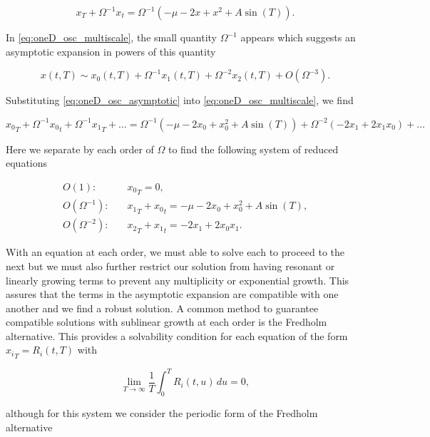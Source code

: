\begin{equation}\label{eq:oneD_osc_multiscale}
x_T+\Omega^{-1}x_t=\Omega^{-1}\left(-\mu-2x+x^2+A\sin(T)\right).
\end{equation}

In \eqref{eq:oneD_osc_multiscale}, the small quantity $\Omega^{-1}$ appears which suggests an asymptotic expansion in powers of this quantity

\begin{equation}\label{eq:oneD_osc_asymptotic}
x(t,T)\sim x_0(t,T)+\Omega^{-1}x_1(t,T)+\Omega^{-2}x_2(t,T)+O(\Omega^{-3}).
\end{equation}

Substituting \eqref{eq:oneD_osc_asymptotic} into \eqref{eq:oneD_osc_multiscale}, we find

\begin{equation*}
{x_0}_T+\Omega^{-1}{x_0}_t+\Omega^{-1}{x_1}_T+\ldots=\Omega^{-1}(-\mu-2x_0+x_0^2+A\sin(T))+\Omega^{-2}(-2x_1+2x_1x_0)+\ldots
\end{equation*}

Here we separate by each order of $\Omega$ to find the following system of reduced equations

\begin{align}
\label{eq:oneD_osc_outerO1}
O(1):& \quad {x_0}_T=0, \\
\label{eq:oneD_osc_outerO2}
O(\Omega^{-1}):& \quad {x_1}_T+{x_0}_t =-\mu-2x_0+x_0^2+A\sin(T),\\
\label{eq:oneD_osc_outerO3}
O(\Omega^{-2}):& \quad {x_2}_T + {x_1}_t= -2x_1+2x_0 x_1.
\end{align}

With an equation at each order, we must able to solve each to proceed to the next but we must also further restrict our solution from having resonant or linearly growing terms to prevent any multiplicity or exponential growth. This assures that the terms in the asymptotic expansion are compatible with one another and we find a robust solution. A common method to guarantee compatible solutions with sublinear growth at each order is the Fredholm alternative. This provides a solvability condition for each equation of the form ${x_i}_T=R_i(t,T)$ with

\begin{equation*}
\lim\limits_{T\to\infty}\frac{1}{T}\int_0^T R_i(t,u)\,du=0,
\end{equation*}

although for this system we consider the periodic form of the Fredholm alternative

